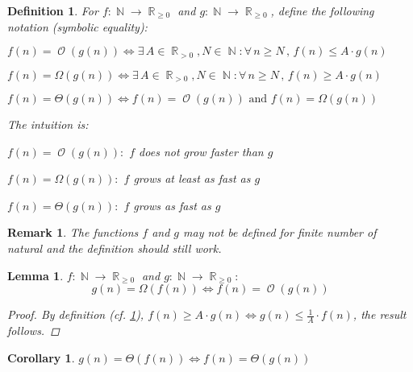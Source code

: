 \documentclass[12pt]{article}
\let\LR\Leftrightarrow
\newcommand{\Forall}[1]{\forall\,{#1}\,,\,}
\newcommand{\Exist}[1]{\exists\,{#1}:}
\DeclareMathOperator{\N}{\mathbb{N}}
\DeclareMathOperator{\R}{\mathbb{R}}
\DeclareMathOperator{\Ord}{\mathcal{O}}
\newtheorem{definition}[theorem]{Definition}
\newtheorem{lemma}[theorem]{Lemma}
\newtheorem{corollary}[theorem]{Corollary}
\newtheorem{remark}[theorem]{Remark}
\begin{document}
\begin{definition}
  \label{def_order}
  For $f:\N\to\R_{\geq 0}$ and $g:\N\to\R_{\geq 0}$, define the following notation (symbolic equality):
  \begin{compactenum}[(i)]
    \item $f(n)=\Ord(g(n))\LR\Exist{A\in\R_{>0},N\in\N}\Forall{n\geq N}f(n)\leq A\cdot g(n)$
    \item $f(n)=\Omega(g(n))\LR\Exist{A\in\R_{>0},N\in\N}\Forall{n\geq N}f(n)\geq A\cdot g(n)$
    \item $f(n)=\Theta(g(n))\LR f(n)=\Ord(g(n))\text{ and }f(n)=\Omega(g(n))$
  \end{compactenum}
  The intuition is:
  \begin{compactenum}[(i)]
    \item $f(n)=\Ord(g(n)):$ $f$ does not grow faster than $g$ 
    \item $f(n)=\Omega(g(n)):$ $f$ grows at least as fast as $g$ 
    \item $f(n)=\Theta(g(n)):$ $f$ grows as fast as $g$ 
  \end{compactenum}
\end{definition}

\begin{remark}
  The functions $f$ and $g$ may not be defined for finite number of natural and the definition should still work.
\end{remark}

\begin{lemma}
  $f:\N\to\R_{\geq 0}$ and $g:\N\to\R_{\geq 0 }:$
  $$g(n)=\Omega(f(n))\LR f(n)=\Ord(g(n))$$
  \begin{proof}
    By definition (cf. \ref{def_order}), $f(n)\geq A\cdot g(n)\LR g(n)\leq \frac{1}{A}\cdot f(n)$, the result follows.
  \end{proof}
\end{lemma}

\begin{corollary}
  $g(n)=\Theta(f(n))\LR f(n)=\Theta(g(n))$
\end{corollary}
\end{document}
